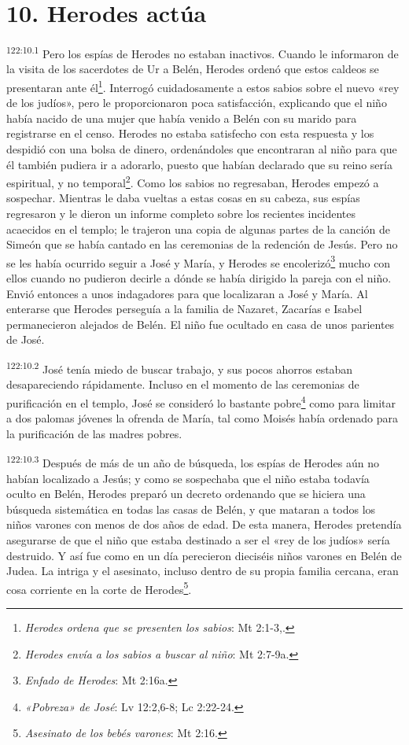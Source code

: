 \section*{10. Herodes actúa}
\par 
\textsuperscript{122:10.1} Pero los espías de Herodes no estaban inactivos. Cuando le informaron de la visita de los sacerdotes de Ur a Belén, Herodes ordenó que estos caldeos se presentaran ante él\footnote{\textit{Herodes ordena que se presenten los sabios}: Mt 2:1-3,.}. Interrogó cuidadosamente a estos sabios sobre el nuevo «rey de los judíos», pero le proporcionaron poca satisfacción, explicando que el niño había nacido de una mujer que había venido a Belén con su marido para registrarse en el censo. Herodes no estaba satisfecho con esta respuesta y los despidió con una bolsa de dinero, ordenándoles que encontraran al niño para que él también pudiera ir a adorarlo, puesto que habían declarado que su reino sería espiritual, y no temporal\footnote{\textit{Herodes envía a los sabios a buscar al niño}: Mt 2:7-9a.}. Como los sabios no regresaban, Herodes empezó a sospechar. Mientras le daba vueltas a estas cosas en su cabeza, sus espías regresaron y le dieron un informe completo sobre los recientes incidentes acaecidos en el templo; le trajeron una copia de algunas partes de la canción de Simeón que se había cantado en las ceremonias de la redención de Jesús. Pero no se les había ocurrido seguir a José y María, y Herodes se encolerizó\footnote{\textit{Enfado de Herodes}: Mt 2:16a.} mucho con ellos cuando no pudieron decirle a dónde se había dirigido la pareja con el niño. Envió entonces a unos indagadores para que localizaran a José y María. Al enterarse que Herodes perseguía a la familia de Nazaret, Zacarías e Isabel permanecieron alejados de Belén. El niño fue ocultado en casa de unos parientes de José.

\par 
\textsuperscript{122:10.2} José tenía miedo de buscar trabajo, y sus pocos ahorros estaban desapareciendo rápidamente. Incluso en el momento de las ceremonias de purificación en el templo, José se consideró lo bastante pobre\footnote{\textit{«Pobreza» de José}: Lv 12:2,6-8; Lc 2:22-24.} como para limitar a dos palomas jóvenes la ofrenda de María, tal como Moisés había ordenado para la purificación de las madres pobres.

\par 
\textsuperscript{122:10.3} Después de más de un año de búsqueda, los espías de Herodes aún no habían localizado a Jesús; y como se sospechaba que el niño estaba todavía oculto en Belén, Herodes preparó un decreto ordenando que se hiciera una búsqueda sistemática en todas las casas de Belén, y que mataran a todos los niños varones con menos de dos años de edad. De esta manera, Herodes pretendía asegurarse de que el niño que estaba destinado a ser el «rey de los judíos» sería destruido. Y así fue como en un día perecieron dieciséis niños varones en Belén de Judea. La intriga y el asesinato, incluso dentro de su propia familia cercana, eran cosa corriente en la corte de Herodes\footnote{\textit{Asesinato de los bebés varones}: Mt 2:16.}.

